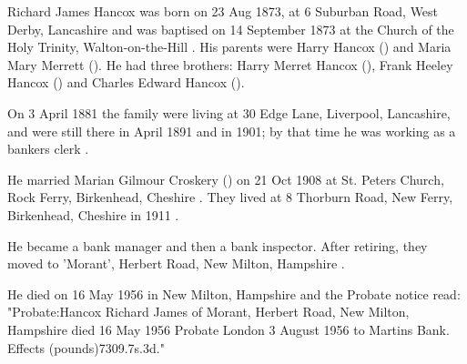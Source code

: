 
Richard James Hancox was born on 23 Aug 1873, at 6 Suburban Road, West Derby, Lancashire \cite{RJHancoxBirth} and was baptised on 14 September 1873 at the Church of the Holy Trinity, Walton-on-the-Hill \cite{RJHancoxBaptism}.  His parents were Harry Hancox () and  Maria Mary Merrett (). He had three brothers: Harry Merret Hancox (), Frank Heeley Hancox () and Charles Edward Hancox ().


On 3 April 1881 the family were living at 30 Edge Lane, Liverpool, Lancashire, \cite{RJHancoxResidence1} and were still there in April 1891 \cite{RJHancoxResidence2} and in 1901; by that time he was working as a bankers clerk \cite{RJHancoxOccupation}.

He married Marian Gilmour Croskery () on 21 Oct 1908 at St. Peters Church,  Rock Ferry, Birkenhead, Cheshire \cite{RJHancoxMarriage}.  They lived at 8 Thorburn Road, New Ferry, Birkenhead, Cheshire in 1911 \cite{RJHancoxResidence3}.

He became a bank manager and then a bank inspector.  After retiring, they moved to 'Morant', Herbert Road, New Milton, Hampshire \cite{RJHancoxResidence4}.


He died on 16 May 1956  in New Milton, Hampshire \cite{RJHancoxDeath} and the Probate notice read:
"Probate:Hancox Richard James of Morant, Herbert Road, New Milton, Hampshire died 16 May 1956 Probate London 3 August 1956 to Martins Bank. Effects (pounds)7309.7s.3d."\cite{RichardHancoxProbate}
